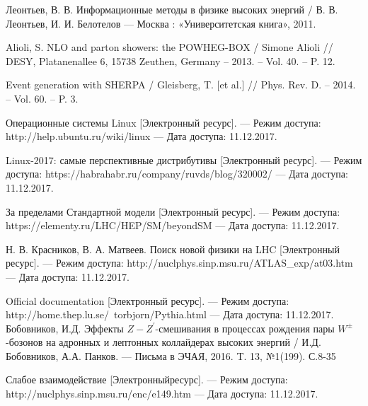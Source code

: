 

	Леонтьев, В. В. 
	Информационные методы в физике высоких энергий 
	/ В. В. Леонтьев, И. И. Белотелов 
	— Москва : «Университетская книга», 2011.

	Alioli, S. NLO and parton showers: the POWHEG-BOX
	/ Simone Alioli 
	// DESY, Platanenallee 6, 15738 Zeuthen, Germany – 2013. – Vol. 40. – P. 12.

	Event generation with SHERPA
	/ Gleisberg, T. [et al.]  
	// Phys. Rev. D. – 2014. – Vol. 60. – P. 3.

	Операционные системы Linux 
	[Электронный ресурс].
	 — Ре­жим доступа: http://help.ubuntu.ru/wiki/linux
	 — Дата доступа: 11.12.2017.
	 
	 Linux-2017: самые перспективные дистрибутивы  
	 [Электронный ресурс].
	 — Ре­жим доступа: https://habrahabr.ru/company/ruvds/blog/320002/
	 — Дата доступа: 11.12.2017.

	За пределами Стандартной модели
	[Электронный ресурс].
	 — Режим доступа: https://elementy.ru/LHC/HEP/SM/beyondSM 
	 — Да­та доступа: 11.12.2017.


	Н. В. Красников, В. А. 
	Матвеев. Поиск новой физики на LHC
	[Электронный ресурс].
	 — Режим доступа: http://nuclphys.sinp.msu.ru/ATLAS\_exp/at03.htm 
	 — Дата доступа: 11.12.2017.
	 
	 Official documentation
	 [Электронный ресурс].
	 — Режим доступа: http://home.thep.lu.se/~torbjorn/Pythia.html 
	 — Дата доступа: 11.12.2017.
	Бобовников, И.Д. Эффекты $Z-Z^\prime$-смешивания в процессах рождения пары $W^±$-бозонов на адронных и лептонных коллайдерах высоких энергий
	/ И.Д. Бобовников, А.А. Панков.
	— Письма в ЭЧАЯ, 2016. T. 13, №1(199). С.8-35
	
	Слабое взаимодействие 
	[Электронныйресурс].
	— Режим доступа: http://nuclphys.sinp.msu.ru/enc/e149.htm
	— Дата доступа: 11.12.2017.

	 
